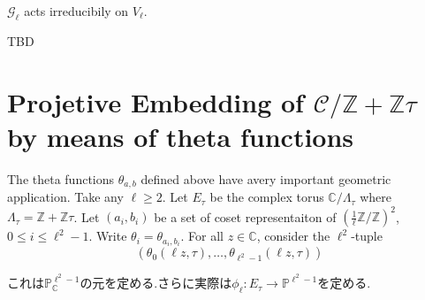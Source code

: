 \documentclass[uplatex,b5j,11pt]{jsbook}
\begin{document}
\begin{lem}
 $\mathcal{G}_{\ell}$ acts irreducibily on $V_{\ell}$.
\end{lem}

TBD

\section{Projetive Embedding of $\mathcal{C}/ \mathbb{Z} + \mathbb{Z}\tau$ by means of theta functions}

The theta functions $\theta_{a,b}$ defined above have avery important geometric application. Take any $\ell \ge 2$. Let $E_{\tau}$ be the complex torus $\mathbb{C}/\Lambda_{\tau}$ where $\Lambda_{\tau} = \mathbb{Z} + \mathbb{Z}\tau$.
Let $(a_i, b_i)$ be a set of coset representaiton of $( \frac{1}{\ell} \mathbb{Z}/ \mathbb{Z})^2$, $0 \le i \le \ell^2 - 1$.
Write $\theta_i = \theta_{a_i, b_i}$.
For all $z \in \mathbb{C}$, consider the $\ell^2$-tuple
\begin{equation*}
  (\theta_0(\ell z, \tau), \ldots, \theta_{\ell^2 -1}(\ell z, \tau))
\end{equation*}

これは$\mathbb{P}_{\mathbb{C}}^{\ell^2-1}$の元を定める.さらに実際は$\phi_{\ell}:E_{\tau} \to \mathbb{P}^{\ell^2 -1}$を定める.
\end{document}
